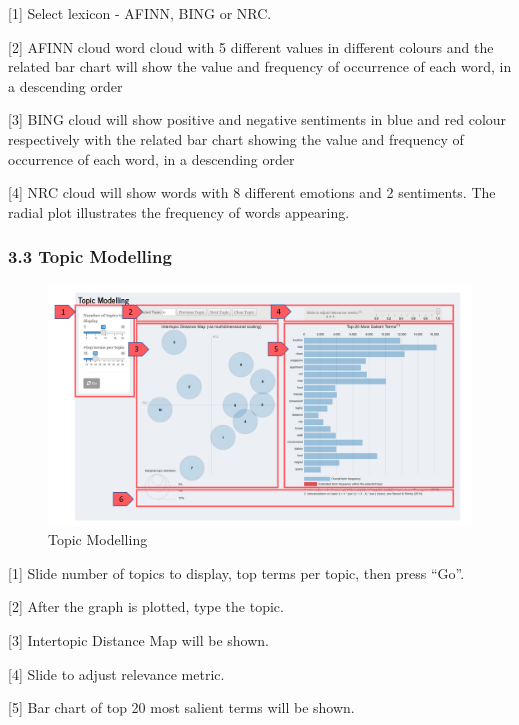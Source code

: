 \documentclass[
  12pt,
]{article}
\begin{document}
{[}1{]} Select lexicon - AFINN, BING or NRC.

{[}2{]} AFINN cloud word cloud with 5 different values in different
colours and the related bar chart will show the value and frequency of
occurrence of each word, in a descending order

{[}3{]} BING cloud will show positive and negative sentiments in blue
and red colour respectively with the related bar chart showing the value
and frequency of occurrence of each word, in a descending order

{[}4{]} NRC cloud will show words with 8 different emotions and 2
sentiments. The radial plot illustrates the frequency of words
appearing.

\hypertarget{topic-modelling}{%
\subsubsection{3.3 Topic Modelling}\label{topic-modelling}}

\begin{figure}[H]

{\centering \includegraphics[width=0.95\linewidth]{images/topicmodelling} 

}

\caption{Topic Modelling}\label{fig:unnamed-chunk-16}
\end{figure}

{[}1{]} Slide number of topics to display, top terms per topic, then
press ``Go''.

{[}2{]} After the graph is plotted, type the topic.

{[}3{]} Intertopic Distance Map will be shown.

{[}4{]} Slide to adjust relevance metric.

{[}5{]} Bar chart of top 20 most salient terms will be shown.
\end{document}
